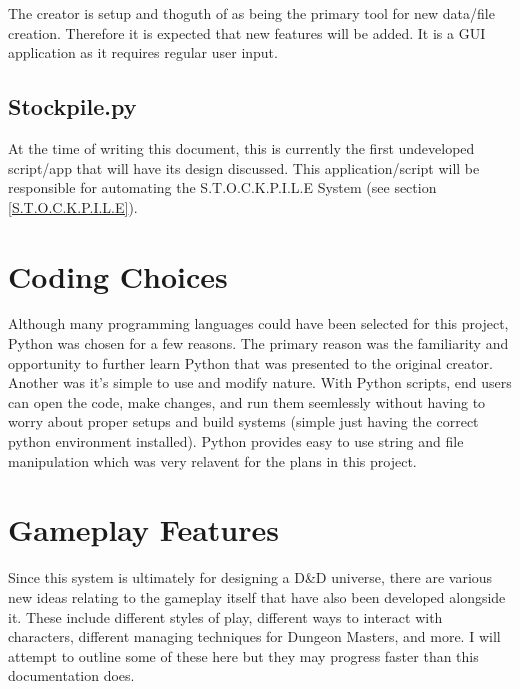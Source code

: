 The creator is setup and thoguth of as being the primary tool for new data/file creation. Therefore it is expected that new features will be added. It is a GUI application as it requires regular user input.

\subsection{Stockpile.py}

At the time of writing this document, this is currently the first undeveloped script/app that will have its design discussed. This application/script will be responsible for automating the S.T.O.C.K.P.I.L.E System (see section \ref{S.T.O.C.K.P.I.L.E}).



\section{Coding Choices}

Although many programming languages could have been selected for this project, Python was chosen for a few reasons. The primary reason was the familiarity and opportunity to further learn Python that was presented to the original creator. Another was it's simple to use and modify nature. With Python scripts, end users can open the code, make changes, and run them seemlessly without having to worry about proper setups and build systems (simple just having the correct python environment installed). Python provides easy to use string and file manipulation which was very relavent for the plans in this project. 


\section{Gameplay Features}

Since this system is ultimately for designing a D\&D universe, there are various new ideas relating to the gameplay itself that have also been developed alongside it. These include different styles of play, different ways to interact with characters, different managing techniques for Dungeon Masters, and more. I will attempt to outline some of these here but they may progress faster than this documentation does.

